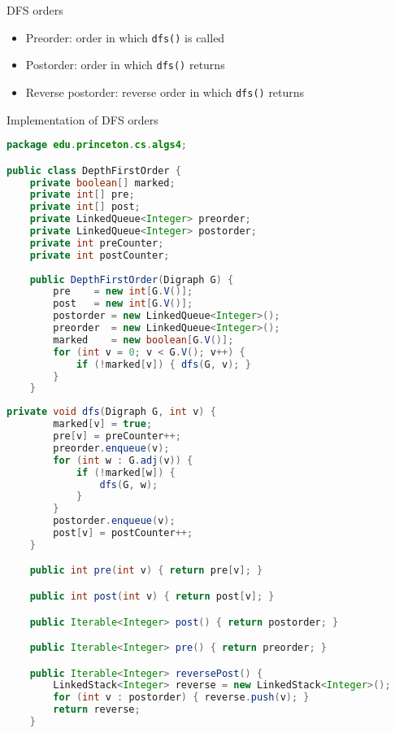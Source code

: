\documentclass[8pt,a4paper,compress]{beamer}
\begin{document}
\begin{frame}[fragile]
\pause

DFS orders
\begin{itemize}
\item Preorder: order in which \lstinline{dfs()} is called

\item Postorder: order in which \lstinline{dfs()} returns

\item Reverse postorder: reverse order in which \lstinline{dfs()} returns
\end{itemize}

\pause
\bigskip

Implementation of DFS orders
\begin{lstlisting}[language=Java]
package edu.princeton.cs.algs4;

public class DepthFirstOrder {
    private boolean[] marked;          
    private int[] pre; 
    private int[] post; 
    private LinkedQueue<Integer> preorder; 
    private LinkedQueue<Integer> postorder; 
    private int preCounter; 
    private int postCounter; 
    
    public DepthFirstOrder(Digraph G) {
        pre    = new int[G.V()];
        post   = new int[G.V()];
        postorder = new LinkedQueue<Integer>();
        preorder  = new LinkedQueue<Integer>();
        marked    = new boolean[G.V()];
        for (int v = 0; v < G.V(); v++) { 
            if (!marked[v]) { dfs(G, v); }
        }
    }
\end{lstlisting}
\end{frame}

\begin{frame}[fragile]
\pause

\begin{lstlisting}[language=Java]    
    private void dfs(Digraph G, int v) {
        marked[v] = true;
        pre[v] = preCounter++;
        preorder.enqueue(v);
        for (int w : G.adj(v)) {
            if (!marked[w]) { 
                dfs(G, w); 
            }
        }
        postorder.enqueue(v);
        post[v] = postCounter++;
    }

    public int pre(int v) { return pre[v]; }

    public int post(int v) { return post[v]; }

    public Iterable<Integer> post() { return postorder; }

    public Iterable<Integer> pre() { return preorder; }

    public Iterable<Integer> reversePost() {
        LinkedStack<Integer> reverse = new LinkedStack<Integer>();
        for (int v : postorder) { reverse.push(v); }
        return reverse;
    }
\end{lstlisting}
\end{frame}
\end{document}
